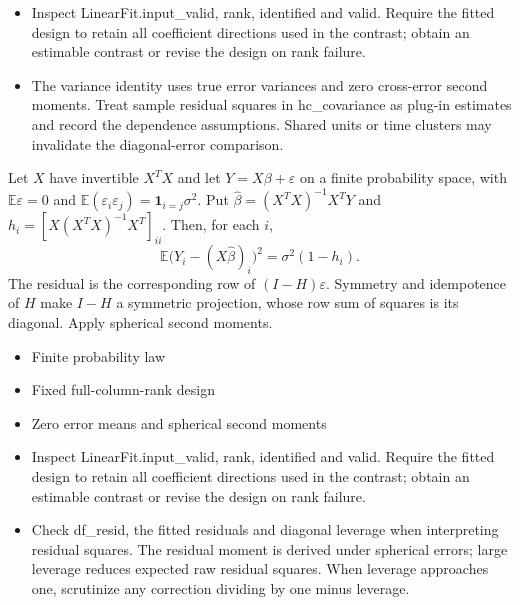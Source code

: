 \expandafter\def\csname statadic@diagnostics@STATADIC-LINEAR-007\endcsname{\begin{itemize}
\item Inspect LinearFit.input\_valid, rank, identified and valid. Require the fitted design to retain all coefficient directions used in the contrast; obtain an estimable contrast or revise the design on rank failure.
\item The variance identity uses true error variances and zero cross-error second moments. Treat sample residual squares in hc\_covariance as plug-in estimates and record the dependence assumptions. Shared units or time clusters may invalidate the diagonal-error comparison.
\end{itemize}}
\expandafter\def\csname statadic@statement@STATADIC-LINEAR-008\endcsname{Let $X$ have invertible $X^TX$ and let $Y=X\beta+\varepsilon$
  on a finite probability space, with $\mathbb E\varepsilon=0$ and
  $\mathbb E(\varepsilon_i\varepsilon_j)=\mathbf 1_{i=j}\sigma^2$.
  Put $\hat\beta=(X^TX)^{-1}X^TY$ and
  $h_i=[X(X^TX)^{-1}X^T]_{ii}$. Then, for each $i$,
  \[\mathbb E\bigl(Y_i-(X\hat\beta)_i\bigr)^2=\sigma^2(1-h_i).\]}
\expandafter\def\csname statadic@proof@STATADIC-LINEAR-008\endcsname{The residual is the corresponding row of $(I-H)\varepsilon$.
  Symmetry and idempotence of $H$ make $I-H$ a symmetric projection, whose
  row sum of squares is its diagonal. Apply spherical second moments.}
\expandafter\def\csname statadic@assumptions@STATADIC-LINEAR-008\endcsname{\begin{itemize}
\item Finite probability law
\item Fixed full-column-rank design
\item Zero error means and spherical second moments
\end{itemize}}
\expandafter\def\csname statadic@diagnostics@STATADIC-LINEAR-008\endcsname{\begin{itemize}
\item Inspect LinearFit.input\_valid, rank, identified and valid. Require the fitted design to retain all coefficient directions used in the contrast; obtain an estimable contrast or revise the design on rank failure.
\item Check df\_resid, the fitted residuals and diagonal leverage when interpreting residual squares. The residual moment is derived under spherical errors; large leverage reduces expected raw residual squares. When leverage approaches one, scrutinize any correction dividing by one minus leverage.
\end{itemize}}
